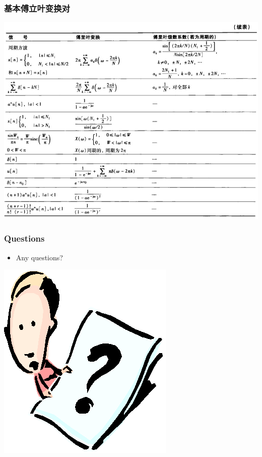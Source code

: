 \documentclass[CJKutf8,xcolor=pdftex,dvipsnames,table]{beamer}
\begin{document}
\begin{CJK*}{UTF8}{song}
  \begin{frame}
    \frametitle{基本傅立叶变换对}
    \begin{center}
      \includegraphics[scale=.32]{ss-c-t5-2b}
    \end{center}
  \end{frame}      
    
  \begin{frame}
    \frametitle{Questions}
    \begin{itemize}
    \item Any questions?
    \end{itemize}
    \begin{center}
      \includegraphics[scale=.5]{question}
    \end{center}
  \end{frame}       
        

\end{CJK*}
\end{document}
